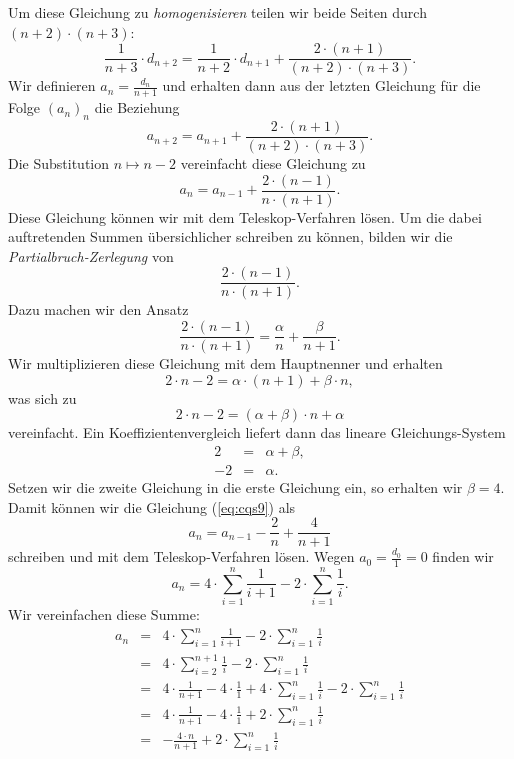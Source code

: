 Um diese Gleichung zu \emph{homogenisieren} teilen wir beide Seiten durch $(n+2) \cdot(n+3)$:
\begin{equation}
  \label{eq:cqs8}
 \frac{1}{n+3} \cdot d_{n+2} = \frac{1}{n+2}\cdot d_{n+1} + \frac{2\cdot(n+1)}{(n+2)\cdot(n+3)}.
\end{equation}
Wir definieren $\displaystyle a_n = \frac{d_n}{n+1}$ und erhalten dann aus der
letzten Gleichung f\"{u}r die Folge $(a_n)_n$ die Beziehung
\[ a_{n+2} = a_{n+1} + \frac{2\cdot(n+1)}{(n+2)\cdot(n+3)}. \]
Die Substitution $n \mapsto n-2$ vereinfacht diese Gleichung zu 
\begin{equation}
  \label{eq:cqs9}
 a_{n} = a_{n-1} + \frac{2\cdot(n-1)}{n\cdot(n+1)}.
\end{equation}
Diese Gleichung k\"{o}nnen wir mit dem Teleskop-Verfahren l\"{o}sen.  Um die dabei auftretenden Summen \"{u}bersichlicher
schreiben zu k\"{o}nnen,  bilden wir die \emph{Partialbruch-Zerlegung} von 
\[ \frac{2\cdot(n-1)}{n\cdot(n+1)}. \] 
Dazu machen wir den Ansatz
\[ \frac{2\cdot(n-1)}{n\cdot(n+1)} = \frac{\alpha}{n} + \frac{\beta}{n+1}.\]
Wir multiplizieren diese Gleichung mit dem Hauptnenner und erhalten
\[ 2\cdot n - 2 = \alpha \cdot (n+1) + \beta \cdot n, \]
was sich zu 
\[ 2\cdot n - 2 = (\alpha + \beta) \cdot n + \alpha \]
vereinfacht.  Ein Koeffizientenvergleich liefert dann das lineare Gleichungs-System
\begin{eqnarray*}
  2 & = & \alpha + \beta, \\
 -2 & = & \alpha.
\end{eqnarray*}
Setzen wir die zweite Gleichung in die erste Gleichung ein, so erhalten wir $\beta = 4$.
Damit k\"{o}nnen wir die Gleichung (\ref{eq:cqs9}) als 
\begin{equation}
  \label{eq:cqs10}
 a_{n} = a_{n-1} - \frac{2}{n} + \frac{4}{n+1}  
\end{equation}
schreiben und mit  dem Teleskop-Verfahren l\"{o}sen.  Wegen $a_0 = \frac{d_0}{1} = 0$ finden wir
\begin{equation}
  \label{eq:cqs11}
 a_{n} = 4 \cdot \sum_{i=1}^n \frac{1}{i+1} - 2 \cdot \sum_{i=1}^n \frac{1}{i}.  
\end{equation}
Wir vereinfachen diese Summe:
\[
\begin{array}{lcl}
 a_{n} & = & \displaystyle 4 \cdot \sum_{i=1}^n \frac{1}{i+1} - 2 \cdot \sum_{i=1}^n \frac{1}{i} \\[0.5cm]
       & = & \displaystyle 4 \cdot \sum_{i=2}^{n+1} \frac{1}{i} - 2 \cdot \sum_{i=1}^n \frac{1}{i} \\[0.5cm]
       & = & \displaystyle 4 \cdot \frac{1}{n+1} - 4 \cdot \frac{1}{1} + 4 \cdot \sum_{i=1}^{n} \frac{1}{i} - 2 \cdot \sum_{i=1}^n \frac{1}{i} \\[0.5cm]
       & = & \displaystyle 4 \cdot \frac{1}{n+1} - 4 \cdot \frac{1}{1} + 2 \cdot \sum_{i=1}^{n} \frac{1}{i}  \\[0.5cm]
       & = & \displaystyle - \frac{4 \cdot n}{n+1}  + 2 \cdot \sum_{i=1}^{n} \frac{1}{i}  
\end{array}
\]
